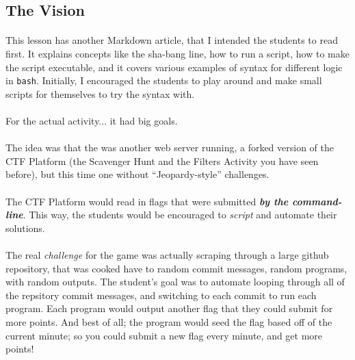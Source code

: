\documentclass[11pt]{article}
\begin{document}
	\subsection{The Vision}

	\paragraph{} This lesson has another Markdown article, that I intended the students to read first. It explains concepts like the sha-bang line, how to run a script, how to make the script executable, and it covers various examples of syntax for different logic in \texttt{bash}. Initially, I encouraged the students to play around and make small scripts for themselves to try the syntax with.

	\paragraph{} For the actual activity... it had big goals.

	\paragraph{} The idea was that the was another web server running, a forked version of the CTF Platform (the Scavenger Hunt and the Filters Activity you have seen before), but this time one without ``Jeopardy-style'' challenges. 

	\paragraph{} The CTF Platform would read in flags that were submitted \textbf{\textit{by the command-line}}. This way, the students would be encouraged to \textit{script} and automate their solutions.

	\paragraph{} The real \textit{challenge} for the game was actually scraping through a large github repository, that was cooked have to random commit messages, random programs, with random outputs. The student's goal was to automate looping through all of the repsitory commit messages, and switching to each commit to run each program. Each program would output another flag that they could submit for more points. And best of all; the program would seed the flag based off of the current minute; so you could submit a new flag every minute, and get more points!
\end{document}
